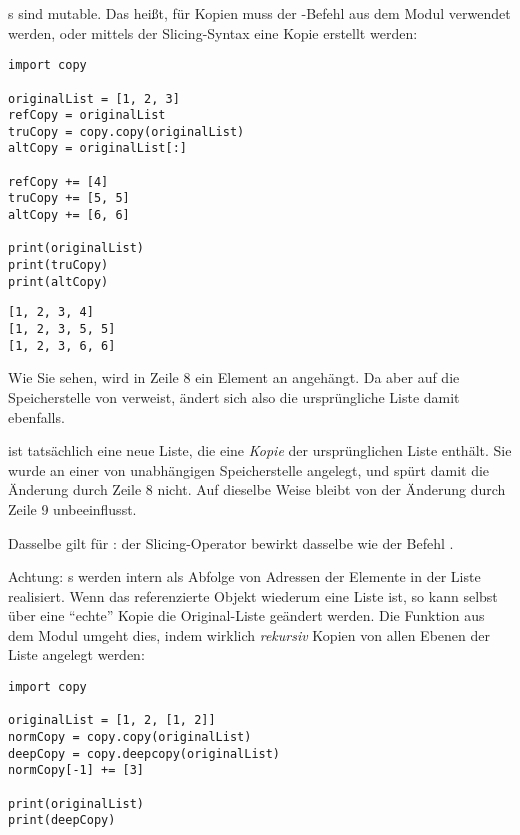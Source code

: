 s sind mutable. Das heißt, für Kopien muss der -Befehl aus dem Modul  verwendet werden, oder mittels der Slicing-Syntax eine Kopie erstellt werden:
\begin{codebox}
\begin{verbatim}
import copy

originalList = [1, 2, 3]
refCopy = originalList
truCopy = copy.copy(originalList)
altCopy = originalList[:]

refCopy += [4]
truCopy += [5, 5]
altCopy += [6, 6]

print(originalList)
print(truCopy)
print(altCopy)
\end{verbatim}
\end{codebox}

\begin{cmdbox}[Ausgabe]
\begin{verbatim}
[1, 2, 3, 4]
[1, 2, 3, 5, 5]
[1, 2, 3, 6, 6]
\end{verbatim}
\end{cmdbox}

Wie Sie sehen, wird in Zeile 8 ein Element an  angehängt. Da  aber auf die Speicherstelle von  verweist, ändert sich also die ursprüngliche Liste damit ebenfalls.

 ist tatsächlich eine neue Liste, die eine \emph{Kopie} der ursprünglichen Liste enthält. Sie wurde an einer von  unabhängigen Speicherstelle angelegt, und spürt damit die Änderung durch Zeile 8 nicht. Auf dieselbe Weise bleibt  von der Änderung durch Zeile 9 unbeeinflusst.

Dasselbe gilt für : der Slicing-Operator bewirkt dasselbe wie der Befehl .

Achtung: s werden intern als Abfolge von Adressen der Elemente in der Liste realisiert. Wenn das referenzierte Objekt wiederum eine Liste ist, so kann selbst über eine \enquote{echte} Kopie die Original-Liste geändert werden. Die Funktion  aus dem Modul  umgeht dies, indem wirklich \emph{rekursiv} Kopien von allen Ebenen der Liste angelegt werden:

\begin{codebox}
\begin{verbatim}
import copy

originalList = [1, 2, [1, 2]]
normCopy = copy.copy(originalList)
deepCopy = copy.deepcopy(originalList)
normCopy[-1] += [3]

print(originalList)
print(deepCopy)
\end{verbatim}
\end{codebox}

